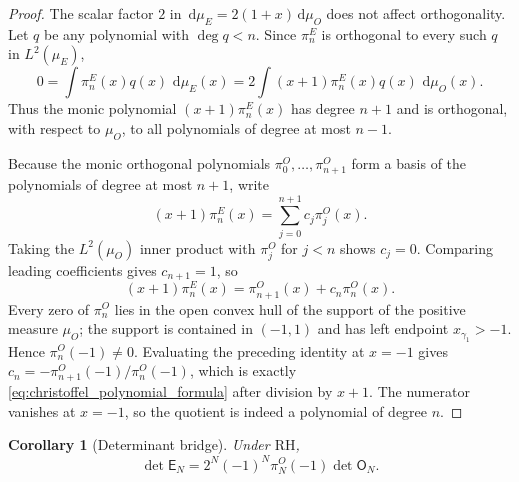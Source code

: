 \documentclass[preprint,12pt]{elsarticle}
\numberwithin{equation}{section}
\theoremstyle{plain}
\newtheorem{corollary}[theorem]{Corollary}
\theoremstyle{definition}
\theoremstyle{remark}
\newcommand{\RH}{\mathrm{RH}}
\newcommand{\E}{\mathsf E}
\newcommand{\Omat}{\mathsf O}
\newcommand{\dd}{\,\mathrm d}
\begin{document}
\begin{proof}
The scalar factor $2$ in $\dd\mu_E=2(1+x)\dd\mu_O$ does not affect orthogonality.  Let $q$ be any polynomial with $\deg q<n$.  Since $\pi_n^E$ is orthogonal to every such $q$ in $L^2(\mu_E)$,
\begin{equation}
0=\int \pi_n^E(x)q(x)\,\dd\mu_E(x)
=2\int (x+1)\pi_n^E(x)q(x)\,\dd\mu_O(x).
\end{equation}
Thus the monic polynomial $(x+1)\pi_n^E(x)$ has degree $n+1$ and is orthogonal, with respect to $\mu_O$, to all polynomials of degree at most $n-1$.

Because the monic orthogonal polynomials $\pi_0^O,\ldots,\pi_{n+1}^O$ form a basis of the polynomials of degree at most $n+1$, write
\begin{equation}
(x+1)\pi_n^E(x)=\sum_{j=0}^{n+1}c_j\pi_j^O(x).
\end{equation}
Taking the $L^2(\mu_O)$ inner product with $\pi_j^O$ for $j<n$ shows $c_j=0$.  Comparing leading coefficients gives $c_{n+1}=1$, so
\begin{equation}
(x+1)\pi_n^E(x)=\pi_{n+1}^O(x)+c_n\pi_n^O(x).
\end{equation}
Every zero of $\pi_n^O$ lies in the open convex hull of the support of the positive measure $\mu_O$; the support is contained in $( -1,1)$ and has left endpoint $x_{\gamma_1}>-1$.  Hence $\pi_n^O(-1)\ne0$.  Evaluating the preceding identity at $x=-1$ gives
$c_n=-\pi_{n+1}^O(-1)/\pi_n^O(-1)$, which is exactly \eqref{eq:christoffel_polynomial_formula} after division by $x+1$.  The numerator vanishes at $x=-1$, so the quotient is indeed a polynomial of degree $n$.
\end{proof}

\begin{corollary}[Determinant bridge]
\label{cor:determinant_bridge}
Under $\RH$,
\begin{equation}
\det\E_N
=2^N(-1)^N\pi_N^O(-1)\det\Omat_N.
\label{eq:determinant_bridge}
\end{equation}
\end{corollary}
\end{document}
